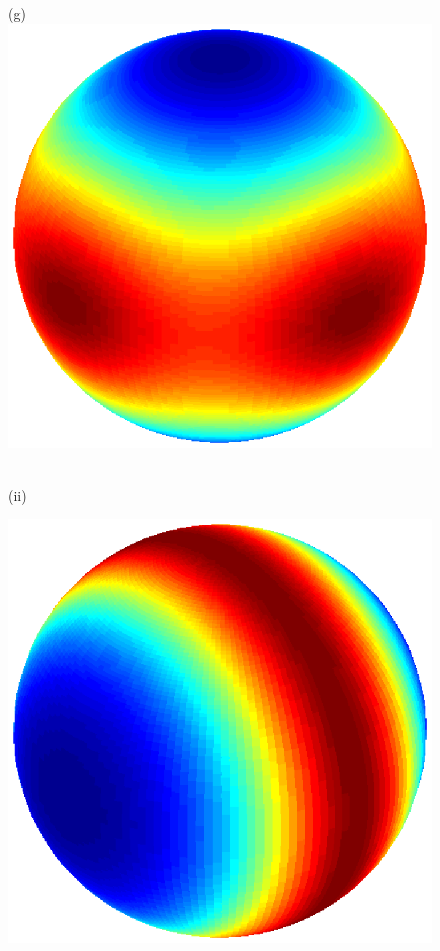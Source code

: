 \documentclass[dvips,aoas,preprint]{imsart}
\numberwithin{equation}{section}
\theoremstyle{plain}
\begin{document}
\begin{figure}[!htbp]
\begin{minipage}[]{0.12\textwidth}
    \end{minipage}
    \begin{minipage}[]{0.12\textwidth}
      \centering
      (g)
      \includegraphics*[width=\textwidth]{figure1j1.eps}
    \end{minipage}
    \\(ii)
    \begin{minipage}[]{0.12\textwidth}
      \centering
      \includegraphics*[width=\textwidth]{figure2b1.eps}

\end{minipage}
\end{figure}
\end{document}
